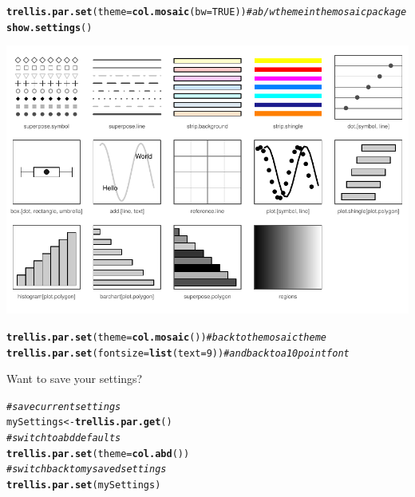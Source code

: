 \documentclass[twoside]{book}\usepackage[]{graphicx}\usepackage[]{xcolor}
\makeatletter
\def\maxwidth{ %
  \ifdim\Gin@nat@width>\linewidth
    \linewidth
  \else
    \Gin@nat@width
  \fi
}
\newcommand{\hlnum}[1]{\textcolor[rgb]{0.686,0.059,0.569}{#1}}%
\newcommand{\hlcom}[1]{\textcolor[rgb]{0.678,0.584,0.686}{\textit{#1}}}%
\newcommand{\hlstd}[1]{\textcolor[rgb]{0.345,0.345,0.345}{#1}}%
\newcommand{\hlkwb}[1]{\textcolor[rgb]{0.69,0.353,0.396}{#1}}%
\newcommand{\hlkwc}[1]{\textcolor[rgb]{0.333,0.667,0.333}{#1}}%
\newcommand{\hlkwd}[1]{\textcolor[rgb]{0.737,0.353,0.396}{\textbf{#1}}}%
\newenvironment{kframe}{%
 \def\at@end@of@kframe{}%
 \ifinner\ifhmode%
  \def\at@end@of@kframe{\end{minipage}}%
  \begin{minipage}{\columnwidth}%
 \fi\fi%
 \def\FrameCommand##1{\hskip\@totalleftmargin \hskip-\fboxsep
 \colorbox{shadecolor}{##1}\hskip-\fboxsep
     \hskip-\linewidth \hskip-\@totalleftmargin \hskip\columnwidth}%
 \MakeFramed {\advance\hsize-\width
   \@totalleftmargin\z@ \linewidth\hsize
   \@setminipage}}%
 {\par\unskip\endMakeFramed%
 \at@end@of@kframe}
\newenvironment{knitrout}{}{} %
\makeatother
\begin{document}
\begin{knitrout}
\color{fgcolor}\begin{kframe}
\begin{alltt}
\hlkwd{trellis.par.set}\hlstd{(}\hlkwc{theme} \hlstd{=} \hlkwd{col.mosaic}\hlstd{(}\hlkwc{bw} \hlstd{=} \hlnum{TRUE}\hlstd{))}  \hlcom{# a b/w theme in the mosaic package}
\hlkwd{show.settings}\hlstd{()}
\end{alltt}
\end{kframe}

{\centering \includegraphics[width=\maxwidth,height=.4\textheight]{figures/fig-themes-mosaicbw-1} 

}



\end{knitrout}

\begin{knitrout}
\color{fgcolor}\begin{kframe}
\begin{alltt}
\hlkwd{trellis.par.set}\hlstd{(}\hlkwc{theme}\hlstd{=}\hlkwd{col.mosaic}\hlstd{())}       \hlcom{# back to the mosaic theme}
\hlkwd{trellis.par.set}\hlstd{(}\hlkwc{fontsize}\hlstd{=}\hlkwd{list}\hlstd{(}\hlkwc{text}\hlstd{=}\hlnum{9}\hlstd{))}    \hlcom{# and back to a 10 point font}
\end{alltt}
\end{kframe}
\end{knitrout}

Want to save your settings?
\begin{knitrout}
\color{fgcolor}\begin{kframe}
\begin{alltt}
\hlcom{# save current settings}
\hlstd{mySettings} \hlkwb{<-} \hlkwd{trellis.par.get}\hlstd{()}
\hlcom{# switch to abd defaults}
\hlkwd{trellis.par.set}\hlstd{(}\hlkwc{theme}\hlstd{=}\hlkwd{col.abd}\hlstd{())}
\hlcom{# switch back to my saved settings}
\hlkwd{trellis.par.set}\hlstd{(mySettings)}
\end{alltt}
\end{kframe}
\end{knitrout}
\end{document}
